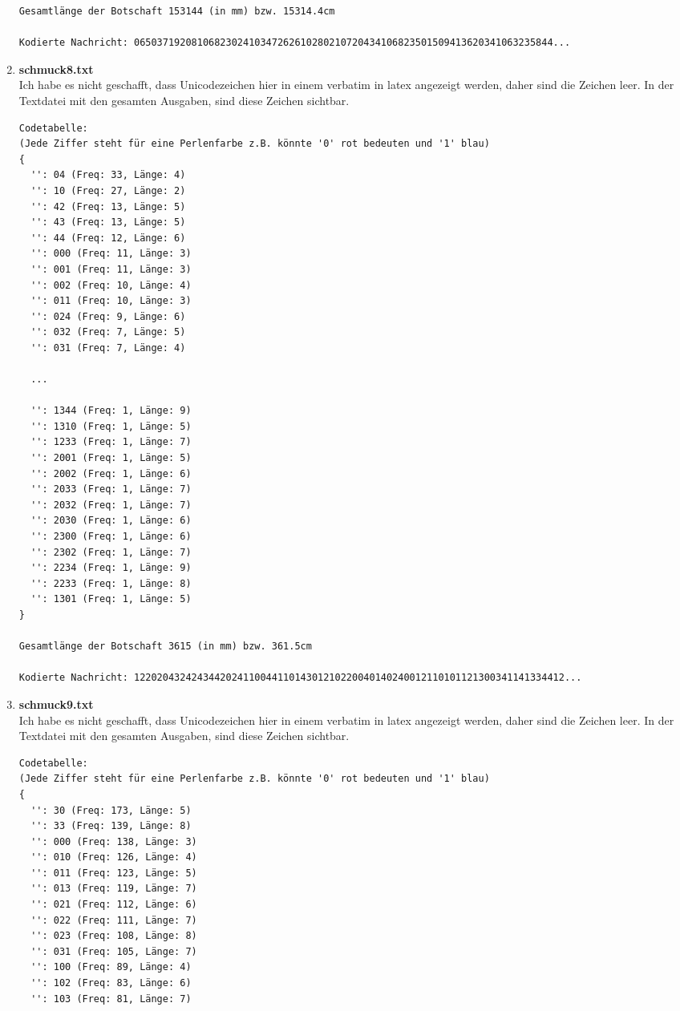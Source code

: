 \documentclass[a4paper,10pt,ngerman]{scrartcl}
\begin{document}
\begin{enumerate}
\begin{verbatim}
Gesamtlänge der Botschaft 153144 (in mm) bzw. 15314.4cm

Kodierte Nachricht: 0650371920810682302410347262610280210720434106823501509413620341063235844...
\end{verbatim}
  \item \textbf{schmuck8.txt}\\
  Ich habe es nicht geschafft, dass Unicodezeichen hier in einem verbatim in latex angezeigt werden, daher sind die Zeichen leer. In der Textdatei mit den gesamten Ausgaben, sind diese Zeichen sichtbar.
\begin{verbatim}
Codetabelle:
(Jede Ziffer steht für eine Perlenfarbe z.B. könnte '0' rot bedeuten und '1' blau)
{
  '': 04 (Freq: 33, Länge: 4)
  '': 10 (Freq: 27, Länge: 2)
  '': 42 (Freq: 13, Länge: 5)
  '': 43 (Freq: 13, Länge: 5)
  '': 44 (Freq: 12, Länge: 6)
  '': 000 (Freq: 11, Länge: 3)
  '': 001 (Freq: 11, Länge: 3)
  '': 002 (Freq: 10, Länge: 4)
  '': 011 (Freq: 10, Länge: 3)
  '': 024 (Freq: 9, Länge: 6)
  '': 032 (Freq: 7, Länge: 5)
  '': 031 (Freq: 7, Länge: 4)

  ...

  '': 1344 (Freq: 1, Länge: 9)
  '': 1310 (Freq: 1, Länge: 5)
  '': 1233 (Freq: 1, Länge: 7)
  '': 2001 (Freq: 1, Länge: 5)
  '': 2002 (Freq: 1, Länge: 6)
  '': 2033 (Freq: 1, Länge: 7)
  '': 2032 (Freq: 1, Länge: 7)
  '': 2030 (Freq: 1, Länge: 6)
  '': 2300 (Freq: 1, Länge: 6)
  '': 2302 (Freq: 1, Länge: 7)
  '': 2234 (Freq: 1, Länge: 9)
  '': 2233 (Freq: 1, Länge: 8)
  '': 1301 (Freq: 1, Länge: 5)
}

Gesamtlänge der Botschaft 3615 (in mm) bzw. 361.5cm

Kodierte Nachricht: 122020432424344202411004411014301210220040140240012110101121300341141334412...

\end{verbatim}
  \item \textbf{schmuck9.txt}\\
  Ich habe es nicht geschafft, dass Unicodezeichen hier in einem verbatim in latex angezeigt werden, daher sind die Zeichen leer. In der Textdatei mit den gesamten Ausgaben, sind diese Zeichen sichtbar.
\begin{verbatim}
Codetabelle:
(Jede Ziffer steht für eine Perlenfarbe z.B. könnte '0' rot bedeuten und '1' blau)
{
  '': 30 (Freq: 173, Länge: 5)
  '': 33 (Freq: 139, Länge: 8)
  '': 000 (Freq: 138, Länge: 3)
  '': 010 (Freq: 126, Länge: 4)
  '': 011 (Freq: 123, Länge: 5)
  '': 013 (Freq: 119, Länge: 7)
  '': 021 (Freq: 112, Länge: 6)
  '': 022 (Freq: 111, Länge: 7)
  '': 023 (Freq: 108, Länge: 8)
  '': 031 (Freq: 105, Länge: 7)
  '': 100 (Freq: 89, Länge: 4)
  '': 102 (Freq: 83, Länge: 6)
  '': 103 (Freq: 81, Länge: 7)


\end{verbatim}
\end{enumerate}
\end{document}
